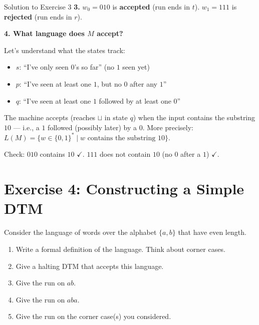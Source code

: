 \documentclass[11pt,a4paper]{article}
\newcommand{\blank}{\sqcup}
\begin{document}
\begin{solutionbox}{Solution to Exercise 3}
\medskip
\textbf{3.} $w_0 = 010$ is \textbf{accepted} (run ends in $t$). $w_1 = 111$ is \textbf{rejected} (run ends in $r$).

\medskip
\textbf{4. What language does $M$ accept?}

Let's understand what the states track:
\begin{itemize}
    \item $s$: ``I've only seen $0$'s so far'' (no $1$ seen yet)
    \item $p$: ``I've seen at least one $1$, but no $0$ after any $1$''
    \item $q$: ``I've seen at least one $1$ followed by at least one $0$''
\end{itemize}

The machine accepts (reaches $\blank$ in state $q$) when the input contains the substring $10$ --- i.e., a $1$ followed (possibly later) by a $0$. More precisely: $L(M) = \{w \in \{0,1\}^* \mid w \text{ contains the substring } 10\}$.

Check: $010$ contains $10$ $\checkmark$. $111$ does not contain $10$ (no $0$ after a $1$) $\checkmark$.
\end{solutionbox}

\newpage

\section*{Exercise 4: Constructing a Simple DTM}

Consider the language of words over the alphabet $\{a, b\}$ that have even length.

\begin{enumerate}
    \item Write a formal definition of the language. Think about corner cases.
    \item Give a halting DTM that accepts this language.
    \item Give the run on $ab$.
    \item Give the run on $aba$.
    \item Give the run on the corner case(s) you considered.
\end{enumerate}
\end{document}
